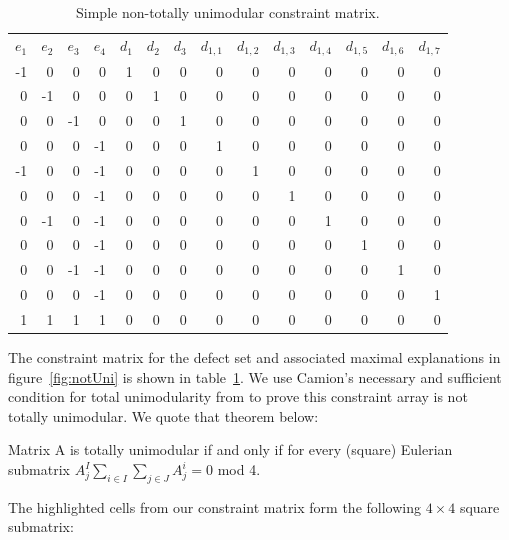\documentclass[11pt,twocolumn]{article}
\begin{document}
\begin{table}[htb!] 
\begin{tabular}{rrrr|rrrrrrrrrr}
$e_1$ & $e_2$ & $e_3$ & $e_4$ & $d_1$ & $d_2$ & $d_3$& $d_{1,1}$ & $d_{1,2}$ & $d_{1,3}$ & $d_{1,4}$ & $d_{1,5}$ & $d_{1,6}$ & $d_{1,7}$  \\
-1 &  0 &  0 &  0 & 1 & 0 & 0 & 0 & 0 & 0 & 0 & 0 & 0 & 0\\
 0 & -1 &  0 &  0 & 0 & 1 & 0 & 0 & 0 & 0 & 0 & 0 & 0 & 0\\
 0 &  0 & -1 &  0 & 0 & 0 & 1 & 0 & 0 & 0 & 0 & 0 & 0 & 0\\
 0 &  0 &  0 & -1 & 0 & 0 & 0 & 1 & 0 & 0 & 0 & 0 & 0 & 0\\
\cellcolor{gray}-1 &  \cellcolor{gray}0 &  \cellcolor{gray}0 & \cellcolor{gray}-1 & 0 & 0 & 0 & 0 & 1 & 0 & 0 & 0 & 0 & 0\\
 0 &  0 &  0 & -1 & 0 & 0 & 0 & 0 & 0 & 1 & 0 & 0 & 0 & 0\\
 \cellcolor{gray}0 & \cellcolor{gray}-1 &  \cellcolor{gray}0 & \cellcolor{gray}-1 & 0 & 0 & 0 & 0 & 0 & 0 & 1 & 0 & 0 & 0\\
 0 &  0 &  0 & -1 & 0 & 0 & 0 & 0 & 0 & 0 & 0 & 1 & 0 & 0\\
 \cellcolor{gray}0 &  \cellcolor{gray}0 & \cellcolor{gray}-1 & \cellcolor{gray}-1 & 0 & 0 & 0 & 0 & 0 & 0 & 0 & 0 & 1 & 0\\
 0 &  0 &  0 & -1 & 0 & 0 & 0 & 0 & 0 & 0 & 0 & 0 & 0 & 1\\
\cellcolor{gray} 1 & \cellcolor{gray} 1 & \cellcolor{gray} 1 & \cellcolor{gray} 1 & 0 & 0 & 0 & 0 & 0 & 0 & 0 & 0 & 0 & 0\\
\end{tabular}
\caption{Simple non-totally unimodular constraint matrix.}
\label{table:notUni}
\end{table}

The constraint matrix for the defect set and associated maximal explanations in figure~\ref{fig:notUni} is shown in table~\ref{table:notUni}. We use Camion's necessary and sufficient condition for total unimodularity from \cite{camion1965} to prove this constraint array is not totally unimodular.  We quote that theorem below:

\begin{thm}
Matrix A is totally unimodular if and only if for every (square) Eulerian submatrix $A_j^I \sum_{i\in I} \sum_{j \in J} A^i_j = 0$ mod 4.
\end{thm}

The highlighted cells from our constraint matrix form the following $4 \times 4$ square submatrix:
\end{document}
